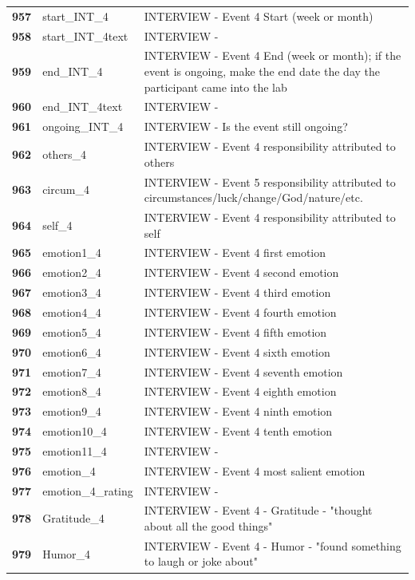\documentclass[
  letterpaper,
  DIV=11,
  numbers=noendperiod]{scrartcl}
\begin{document}
\begin{longtable}[t]{>{}cll}
\textbf{957} & start\_INT\_4 & INTERVIEW - Event 4 Start (week or month)\\
\textbf{958} & start\_INT\_4text & INTERVIEW -\\
\textbf{959} & end\_INT\_4 & INTERVIEW - Event 4 End (week or month); if the event is ongoing, make the end date the day the participant came into the lab\\
\textbf{960} & end\_INT\_4text & INTERVIEW -\\
\addlinespace
\textbf{961} & ongoing\_INT\_4 & INTERVIEW - Is the event still ongoing?\\
\textbf{962} & others\_4 & INTERVIEW - Event 4 responsibility attributed to others\\
\textbf{963} & circum\_4 & INTERVIEW - Event 5 responsibility attributed to circumstances/luck/change/God/nature/etc.\\
\textbf{964} & self\_4 & INTERVIEW - Event 4 responsibility attributed to self\\
\textbf{965} & emotion1\_4 & INTERVIEW - Event 4 first emotion\\
\addlinespace
\textbf{966} & emotion2\_4 & INTERVIEW - Event 4 second emotion\\
\textbf{967} & emotion3\_4 & INTERVIEW - Event 4 third emotion\\
\textbf{968} & emotion4\_4 & INTERVIEW - Event 4 fourth emotion\\
\textbf{969} & emotion5\_4 & INTERVIEW - Event 4 fifth emotion\\
\textbf{970} & emotion6\_4 & INTERVIEW - Event 4 sixth emotion\\
\addlinespace
\textbf{971} & emotion7\_4 & INTERVIEW - Event 4 seventh emotion\\
\textbf{972} & emotion8\_4 & INTERVIEW - Event 4 eighth emotion\\
\textbf{973} & emotion9\_4 & INTERVIEW - Event 4 ninth emotion\\
\textbf{974} & emotion10\_4 & INTERVIEW - Event 4 tenth emotion\\
\textbf{975} & emotion11\_4 & INTERVIEW -\\
\addlinespace
\textbf{976} & emotion\_4 & INTERVIEW - Event 4 most salient emotion\\
\textbf{977} & emotion\_4\_rating & INTERVIEW -\\
\textbf{978} & Gratitude\_4 & INTERVIEW - Event 4 - Gratitude - "thought about all the good things"\\
\textbf{979} & Humor\_4 & INTERVIEW - Event 4 - Humor - "found something to laugh or joke about"\\

\end{longtable}
\end{document}
